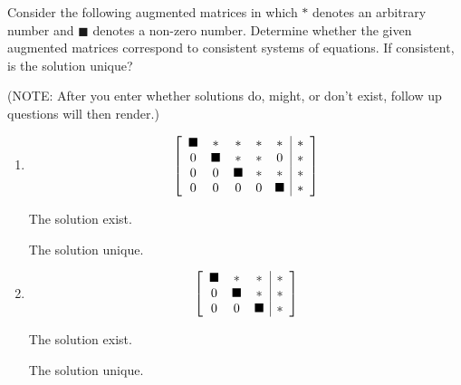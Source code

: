 \documentclass{ximera}
\author{Zack Reed}
\begin{document}
\begin{problem}

Consider the following augmented matrices in which $\ast$ denotes an
arbitrary number and $\blacksquare$ denotes a non-zero number. Determine
whether the given augmented matrices correspond to consistent systems of equations. If consistent, is the
solution unique?

(NOTE: After you enter whether solutions do, might, or don't exist, follow up questions will then render.)

\begin{enumerate}
    \item \begin{equation*}
    \startmat{ccccc|c}
      \blacksquare & \ast & \ast & \ast & \ast & \ast \\
      0 & \blacksquare & \ast & \ast & 0 & \ast \\
      0 & 0 & \blacksquare & \ast & \ast & \ast \\
      0 & 0 & 0 & 0 & \blacksquare & \ast
    \stopmat
\end{equation*}

The solution  exist.

    \begin{problem}
    
        The solution  unique.

    \end{problem}

\item \begin{equation*}
    \startmat{ccc|c}
      \blacksquare & \ast & \ast & \ast \\
      0 & \blacksquare & \ast & \ast \\
      0 & 0 & \blacksquare & \ast
    \stopmat
\end{equation*}

The solution  exist.

    \begin{problem}
    
        The solution  unique.

    \end{problem}


\end{enumerate}
\end{problem}
\end{document}
